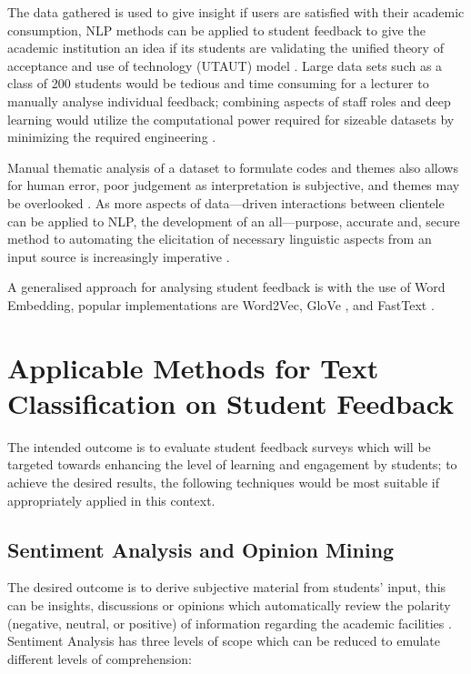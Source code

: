 The data gathered is used to give insight if users are satisfied with their academic consumption, NLP methods can be applied to student feedback to give the academic institution an idea if its students are validating the unified theory of acceptance and use of technology (UTAUT) model \parencite{kayali2020adoption}. Large data sets such as a class of 200 students would be tedious and time consuming for a lecturer to manually analyse individual feedback; combining aspects of staff roles and deep learning would utilize the computational power required for sizeable datasets by minimizing the required engineering \parencite{lecun2015deep}.

Manual thematic analysis of a dataset to formulate codes and themes also allows for human error, poor judgement as interpretation is subjective, and themes may be overlooked \parencite{belotto2018data}. As more aspects of data---driven interactions between clientele can be applied to NLP, the development of an all---purpose, accurate and, secure method to automating the elicitation of necessary linguistic aspects from an input source is increasingly imperative \parencite{sindhu2019aspect}.

A generalised approach for analysing student feedback is with the use of Word Embedding, popular implementations are Word2Vec, GloVe \parencite{pennington2014glove}, and FastText \parencite{edalati2020potential}.

\section{Applicable Methods for Text Classification on Student Feedback}

The intended outcome is to evaluate student feedback surveys which will be targeted towards enhancing the level of learning and engagement by students; to achieve the desired results, the following techniques would be most suitable if appropriately applied in this context.

\subsection{Sentiment Analysis and Opinion Mining}

The desired outcome is to derive subjective material from students’ input, this can be insights, discussions or opinions which automatically review the polarity (negative, neutral, or positive) of information regarding the academic facilities \parencite{kandhro2019student}. Sentiment Analysis has three levels of scope which can be reduced to emulate different levels of comprehension:

